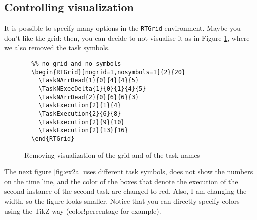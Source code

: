 \documentclass{article}
\begin{document}
\subsection{Controlling visualization}

It is possible to specify many options in the \texttt{RTGrid}
environment. Maybe you don't like the grid: then, you can decide to
not visualise it as in Figure \ref{fig:ex2}, where we also removed the
task symbols.
\begin{figure}[!htbp]
  \centering
  \begin{RTGrid}[nogrid=1,nosymbols=1]{2}{20}
  \end{RTGrid}
\begin{verbatim}
  %% no grid and no symbols
  \begin{RTGrid}[nogrid=1,nosymbols=1]{2}{20}
    \TaskNArrDead{1}{0}{4}{4}{5}    
    \TaskNExecDelta{1}{0}{1}{4}{5}  
    \TaskNArrDead{2}{0}{6}{6}{3}
    \TaskExecution{2}{1}{4}
    \TaskExecution{2}{6}{8}
    \TaskExecution{2}{9}{10}
    \TaskExecution{2}{13}{16}        
  \end{RTGrid}
\end{verbatim}
  \caption{Removing visualization of the grid and of the task names}
  \label{fig:ex2}
\end{figure}

The next figure \ref{fig:ex2a} uses different task symbols, does not
show the numbers on the time line, and the color of the boxes that
denote the execution of the second instance of the second task are
changed to red. Also, I am changing the width, so the figure looks
smaller. Notice that you can directly specify colors using the TikZ
 way (color!percentage for example).
\end{document}
